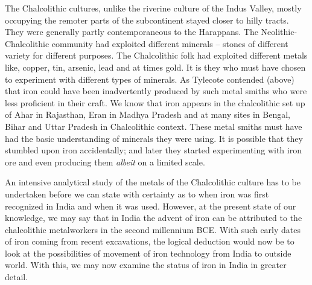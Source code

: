 {The Chalcolithic cultures, unlike the riverine culture of the Indus Valley, mostly occupying the remoter parts of the subcontinent stayed closer to hilly tracts. They were generally partly contemporaneous to the Harappans. The Neolithic-Chalcolithic community had exploited different minerals – stones of different variety for different purposes. The Chalcolithic folk had exploited different metals like, copper, tin, arsenic, lead and at times gold. It is they who must have chosen to experiment with different types of minerals. As Tylecote contended (above) that iron could have been inadvertently produced by such metal smiths who were less proficient in their craft. We know that iron appears in the chalcolithic set up of Ahar in Rajasthan, Eran in Madhya Pradesh and at many sites in Bengal, Bihar and Uttar Pradesh in Chalcolithic context. These metal smiths must have had the basic understanding of minerals they were using. It is possible that they stumbled upon iron accidentally; and later they started experimenting with iron ore and even producing them \textit{albeit} on a limited scale.

An intensive analytical study of the metals of the Chalcolithic culture has to be undertaken before we can state with certainty as to when iron was first recognized in India and when it was used. However, at the present state of our knowledge, we may say that in India the advent of iron can be attributed to the chalcolithic metalworkers in the second millennium BCE. With such early dates of iron coming from recent excavations, the logical deduction would now be to look at the possibilities of movement of iron technology from India to outside world. With this, we may now examine the status of iron in India in greater detail.

\vspace{-.3cm}

\theendnotes 



}
